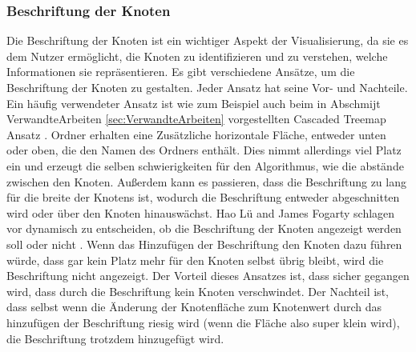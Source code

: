\subsubsection{Beschriftung der Knoten} \label{sec:BeschriftungKnoten}
Die Beschriftung der Knoten ist ein wichtiger Aspekt der Visualisierung, da sie es dem Nutzer ermöglicht, die Knoten zu identifizieren und zu verstehen, welche Informationen sie repräsentieren. Es gibt verschiedene Ansätze, um die Beschriftung der Knoten zu gestalten. Jeder Ansatz hat seine Vor- und Nachteile. Ein häufig verwendeter Ansatz ist wie zum Beispiel auch beim in Abschmijt VerwandteArbeiten \ref{sec:VerwandteArbeiten} vorgestellten Cascaded Treemap Ansatz \cite{lu2008cascaded}.
Ordner erhalten eine Zusätzliche horizontale Fläche, entweder unten oder oben, die den Namen des Ordners enthält. 
Dies nimmt allerdings viel Platz ein und erzeugt die selben schwierigkeiten für den Algorithmus, wie die abstände zwischen den Knoten. Außerdem kann es passieren, dass die Beschriftung zu lang für die breite der Knotens ist, wodurch die Beschriftung entweder abgeschnitten wird oder über den Knoten hinauswächst.
Hao Lü and James Fogarty schlagen vor dynamisch zu entscheiden, ob die Beschriftung der Knoten angezeigt werden soll oder nicht \cite{lu2008cascaded}. Wenn das Hinzufügen der Beschriftung den Knoten dazu führen würde, dass gar kein Platz mehr für den Knoten selbst übrig bleibt, wird die Beschriftung nicht angezeigt. Der Vorteil dieses Ansatzes ist, dass sicher gegangen wird, dass durch die Beschriftung kein Knoten verschwindet. Der Nachteil ist, dass selbst wenn die Änderung der Knotenfläche zum Knotenwert durch das hinzufügen der Beschriftung riesig wird (wenn die Fläche also super klein wird), die Beschriftung trotzdem hinzugefügt wird. 

